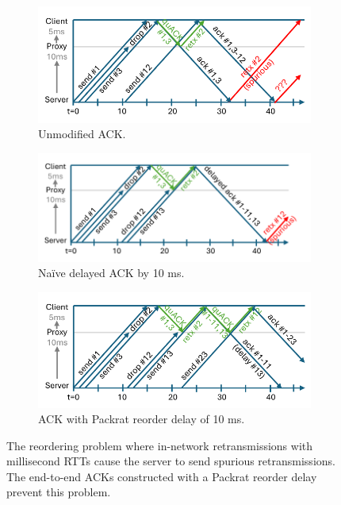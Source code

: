 \begin{figure}
    \centering
    \begin{subfigure}[b]{0.8\linewidth}
        \includegraphics[width=\linewidth, trim=0 10 0 10, clip]{packrat/figures/reordering_unmodified.pdf}
        \caption{Unmodified ACK.}
        \label{fig:packrat:reordering:unmodified}
    \end{subfigure}
    \begin{subfigure}[b]{0.8\linewidth}
        \includegraphics[width=\linewidth, trim=0 9 0 10, clip]{packrat/figures/reordering_delayed_ack.pdf}
        \caption{Na\"ive delayed ACK by 10 ms.}
        \label{fig:packrat:reordering:delayed-ack}
    \end{subfigure}
    \begin{subfigure}[b]{0.8\linewidth}
        \includegraphics[width=\linewidth, trim=0 9 0 10, clip]{packrat/figures/reordering_with_signal.pdf}
        \caption{ACK with Packrat reorder delay of 10 ms.}
        \label{fig:packrat:reordering:packrat}
    \end{subfigure}
    \caption{The reordering problem where in-network retransmissions with
    millisecond RTTs cause the server to send spurious retransmissions. The
    end-to-end ACKs constructed with a Packrat reorder delay prevent this problem.
    }
    \label{fig:packrat:reordering}
\end{figure}
